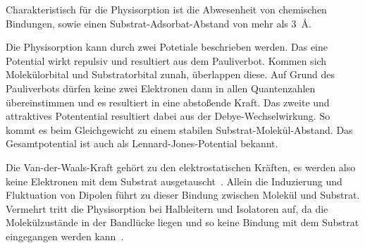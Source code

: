             Charakteristisch für die Physisorption ist die Abwesenheit von chemischen Bindungen, sowie einen Substrat-Adsorbat-Abstand von mehr als \SI{3}{\angstrom}. %

            Die Physisorption kann durch zwei Potetiale beschrieben werden.
            Das eine Potential wirkt repulsiv und resultiert aus dem Pauliverbot.
            Kommen sich Molekülorbital und Substratorbital zunah, überlappen diese.
            Auf Grund des Pauliverbots dürfen keine zwei Elektronen dann in allen Quantenzahlen übereinstimmen und es resultiert in eine abstoßende Kraft.
            Das zweite und attraktives Potentential resultiert dabei aus der Debye-Wechselwirkung.
            So kommt es beim Gleichgewicht zu einem stabilen Substrat-Molekül-Abstand.
            Das Gesamtpotential ist auch als Lennard-Jones-Potential bekannt.
            
            Die Van-der-Waals-Kraft gehört zu den elektrostatischen Kräften, es werden also keine Elektronen mit dem Substrat ausgetauscht~\cite{bergenti_spinterface_2019}.
            Allein die Induzierung und Fluktuation von Dipolen führt zu dieser Bindung zwischen Molekül und Substrat.
            Vermehrt tritt die Physisorption bei Halbleitern und Isolatoren auf, da die Molekülzustände in der Bandlücke liegen und so keine Bindung mit dem Substrat eingegangen werden kann~\cite{IF_1}.
        
